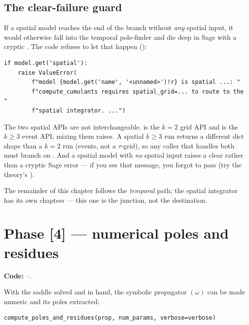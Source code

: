 \subsection{The clear-failure guard}

If a spatial model reaches the end of the branch without \emph{any} spatial input,
it would otherwise fall into the temporal pole-finder and die deep in Sage with a
cryptic . The code refuses to let that happen
():

\begin{lstlisting}
if model.get('spatial'):
    raise ValueError(
        f"model {model.get('name', '<unnamed>')!r} is spatial ...: "
        f"compute_cumulants requires spatial_grid=... to route to the "
        f"spatial integrator. ...")
\end{lstlisting}

\begin{gotcha}
The two spatial APIs are not interchangeable.  is the $k=2$
grid API and  is the $k\ge3$ event API; mixing them raises.
A spatial $k\ge3$ run returns a different dict shape than a $k=2$ run (events, not
a $\tau$-grid), so any caller that handles both must branch on . And a
spatial model with \emph{no} spatial input raises a clear  rather
than a cryptic Sage error --- if you see that message, you forgot to pass
 (try the theory's ).
\end{gotcha}

The remainder of this chapter follows the \emph{temporal} path; the spatial
integrator has its own chapters --- this one is the junction, not the destination.

\section{Phase [4] --- numerical poles and residues}\label{sec:co-poles}

\textbf{Code:} --.

With the saddle solved and  in hand, the symbolic propagator
$(\omega)$ can be made numeric and its poles extracted:

\begin{lstlisting}
compute_poles_and_residues(prop, num_params, verbose=verbose)
\end{lstlisting}

